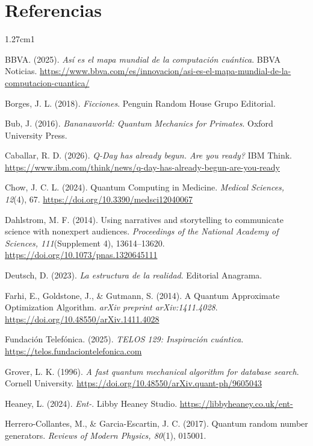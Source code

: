 \documentclass[12pt,a4paper]{article}
\begin{document}
\newpage
\section*{\centering Referencias}

\doublespacing
\begin{hangparas}{1.27cm}{1}

BBVA. (2025). \textit{Así es el mapa mundial de la computación cuántica}. BBVA Noticias. \url{https://www.bbva.com/es/innovacion/asi-es-el-mapa-mundial-de-la-computacion-cuantica/}

Borges, J. L. (2018). \textit{Ficciones}. Penguin Random House Grupo Editorial.

Bub, J. (2016). \textit{Bananaworld: Quantum Mechanics for Primates}. Oxford University Press.

Caballar, R. D. (2026). \textit{Q-Day has already begun. Are you ready?} IBM Think. \url{https://www.ibm.com/think/news/q-day-has-already-begun-are-you-ready}

Chow, J. C. L. (2024). Quantum Computing in Medicine. \textit{Medical Sciences, 12}(4), 67. \url{https://doi.org/10.3390/medsci12040067}

Dahlstrom, M. F. (2014). Using narratives and storytelling to communicate science with nonexpert audiences. \textit{Proceedings of the National Academy of Sciences, 111}(Supplement 4), 13614--13620. \url{https://doi.org/10.1073/pnas.1320645111}

Deutsch, D. (2023). \textit{La estructura de la realidad}. Editorial Anagrama.

Farhi, E., Goldstone, J., \& Gutmann, S. (2014). A Quantum Approximate Optimization Algorithm. \textit{arXiv preprint arXiv:1411.4028}. \url{https://doi.org/10.48550/arXiv.1411.4028}

Fundación Telefónica. (2025). \textit{TELOS 129: Inspiración cuántica}. \url{https://telos.fundaciontelefonica.com}

Grover, L. K. (1996). \textit{A fast quantum mechanical algorithm for database search}. Cornell University. \url{https://doi.org/10.48550/arXiv.quant-ph/9605043}

Heaney, L. (2024). \textit{Ent-}. Libby Heaney Studio. \url{https://libbyheaney.co.uk/ent-}

Herrero-Collantes, M., \& Garcia-Escartin, J. C. (2017). Quantum random number generators. \textit{Reviews of Modern Physics, 80}(1), 015001.


\end{hangparas}
\end{document}
